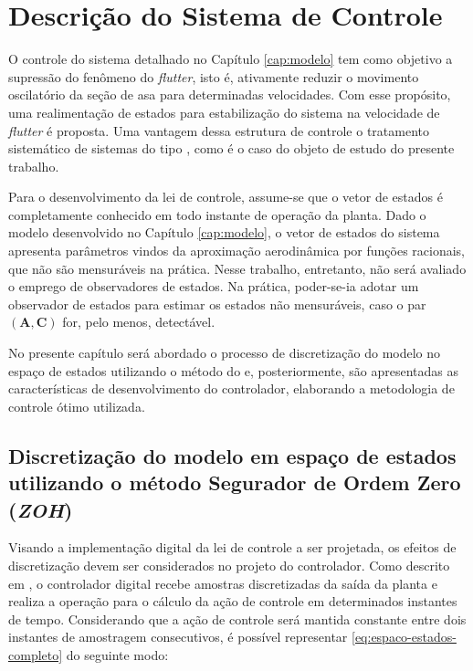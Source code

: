\chapter{Descrição do Sistema de Controle}\label{cap:descricao-controle}

O controle do sistema detalhado no Capítulo \ref{cap:modelo} tem como objetivo a supressão do fenômeno do \textit{flutter}, isto é, ativamente reduzir o movimento oscilatório da seção de asa para determinadas velocidades. Com esse propósito, uma realimentação de estados para estabilização do sistema na velocidade de \textit{flutter} é proposta. Uma vantagem dessa estrutura de controle o tratamento sistemático de sistemas do tipo  \cite{book:Franklin}, como é o caso do objeto de estudo do presente trabalho.

Para o desenvolvimento da lei de controle, assume-se que o vetor de estados é completamente conhecido em todo instante de operação da planta. Dado o modelo desenvolvido no Capítulo \ref{cap:modelo}, o vetor de estados do sistema apresenta parâmetros vindos da aproximação aerodinâmica por funções racionais, que não são mensuráveis na prática. Nesse trabalho, entretanto, não será avaliado o emprego de observadores de estados. Na prática, poder-se-ia adotar um observador de estados para estimar os estados não mensuráveis, caso o par $\left( \boldsymbol{A}, \boldsymbol{C} \right)$ for, pelo menos, detectável.

No presente capítulo será abordado o processo de discretização do modelo no espaço de estados utilizando o método do  e, posteriormente, são apresentadas as características de desenvolvimento do controlador, elaborando a metodologia de controle ótimo utilizada.


\section{Discretização do modelo em espaço de estados utilizando o método Segurador de Ordem Zero (\textit{ZOH})}\label{sec:discretizacao}

Visando a implementação digital da lei de controle a ser projetada, os efeitos de discretização devem ser considerados no projeto do controlador. Como descrito em \textcite{book:Franklin}, o controlador digital recebe amostras discretizadas da saída da planta e realiza a operação para o cálculo da ação de controle em determinados instantes de tempo. Considerando que a ação de controle será mantida constante entre dois instantes de amostragem consecutivos, é possível representar \eqref{eq:espaco-estados-completo} do seguinte modo:

